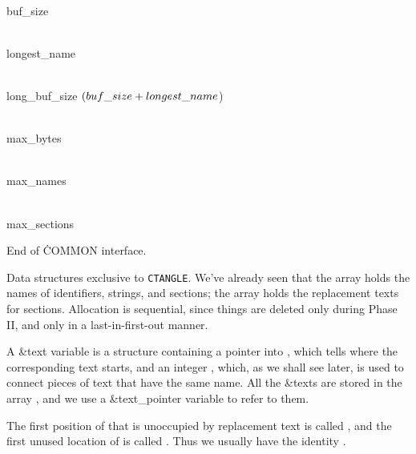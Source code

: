 \Y\B\4\D\\{buf\_size}\5
\par
\B\4\D\\{longest\_name}\5
\par
\B\4\D\\{long\_buf\_size}\5
$(\\{buf\_size}+\\{longest\_name}{}$)\par
\B\4\D\\{max\_bytes}\5
\par
\B\4\D\\{max\_names}\5
\par
\B\4\D\\{max\_sections}\5
\par
\fi

End of \.{COMMON} interface.

\fi

Data structures exclusive to {\tt CTANGLE}.
We've already seen that the  array holds the names of
identifiers,
strings, and sections;
the  array holds the replacement texts
for sections. Allocation is sequential, since things are deleted only
during Phase II, and only in a last-in-first-out manner.

A \&{text} variable is a structure containing a pointer into
, which tells where the corresponding text starts, and an
integer , which, as we shall see later, is used to connect
pieces of text that have the same name.  All the \&{text}s are stored in
the array , and we use a \&{text\_pointer} variable to refer
to them.

The first position of  that is unoccupied by
replacement text is called , and the first unused location of
 is called .  Thus we usually have the
identity
.

